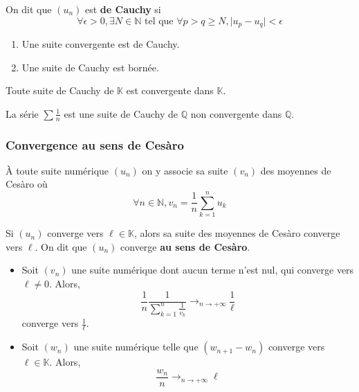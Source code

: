 	
	\begin{definition}
		On dit que $(u_n)$ est \textbf{de Cauchy} si
		\[ \forall \epsilon > 0, \exists N \in \mathbb{N} \text{ tel que } \forall p > q \geq N, \vert u_p - u_q \vert < \epsilon \]
	\end{definition}
	
	\begin{proposition}
		\begin{enumerate}[label=(\roman*)]
			\item Une suite convergente est de Cauchy.
			\item Une suite de Cauchy est bornée.
		\end{enumerate}
	\end{proposition}
	
	\begin{theorem}
		Toute suite de Cauchy de $\mathbb{K}$ est convergente dans $\mathbb{K}$.
	\end{theorem}
	
	
	\begin{cexample}
		La série $\sum \frac{1}{n}$ est une suite de Cauchy de $\mathbb{Q}$ non convergente dans $\mathbb{Q}$.
	\end{cexample}
	
	\newpage
	
	\subsubsection{Convergence au sens de Cesàro}
	
	
	\begin{definition}
		À toute suite numérique $(u_n)$ on y associe sa suite $(v_n)$ des moyennes de Cesàro où
		\[ \forall n \in \mathbb{N}, v_n = \frac{1}{n} \sum_{k=1}^{n} u_k \]
	\end{definition}
	
	\begin{theorem}
		\label{223-2}
		Si $(u_n)$ converge vers $\ell \in \mathbb{K}$, alors sa suite des moyennes de Cesàro converge vers $\ell$. On dit que $(u_n)$ converge \textbf{au sens de Cesàro}.
	\end{theorem}
	
	\begin{example}
		\begin{itemize}
			\item Soit $(v_n)$ une suite numérique dont aucun terme n'est nul, qui converge vers $\ell \neq 0$. Alors,
			\[ \frac{1}{n} \frac{1}{\sum_{k=1}^n \frac{1}{v_k}} \longrightarrow_{n \rightarrow +\infty} \frac{1}{\ell} \]
			converge vers $\frac{1}{\ell}$.
			\item Soit $(w_n)$ une suite numérique telle que $(w_{n+1} - w_n)$ converge vers $\ell \in \mathbb{K}$. Alors,
			\[ \frac{w_n}{n} \longrightarrow_{n \rightarrow +\infty} \ell \]
		\end{itemize}
	\end{example}
	
